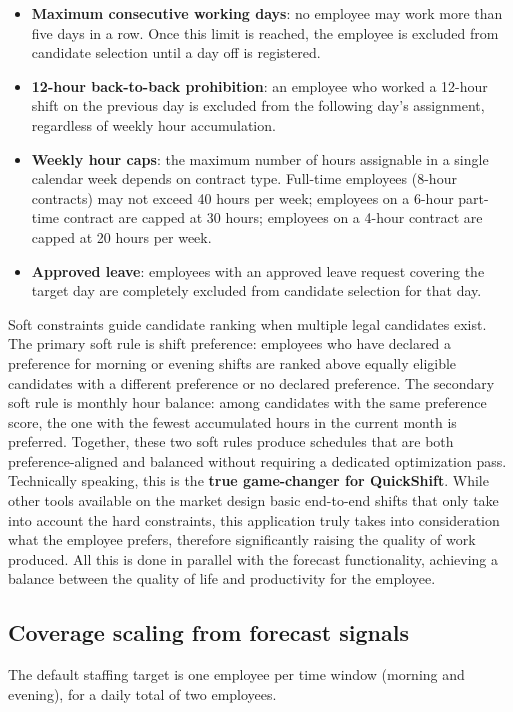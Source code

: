 \begin{itemize}
    \item \textbf{Maximum consecutive working days}: no employee may work more than five days in a row. Once this limit is reached, the employee is excluded from candidate selection until a day off is registered.
    \item \textbf{12-hour back-to-back prohibition}: an employee who worked a 12-hour shift on the previous day is excluded from the following day's assignment, regardless of weekly hour accumulation.
    \item \textbf{Weekly hour caps}: the maximum number of hours assignable in a single calendar week depends on contract type. Full-time employees (8-hour contracts) may not exceed 40 hours per week; employees on a 6-hour part-time contract are capped at 30 hours; employees on a 4-hour contract are capped at 20 hours per week.
    \item \textbf{Approved leave}: employees with an approved leave request covering the target day are completely excluded from candidate selection for that day.
\end{itemize}

\par Soft constraints guide candidate ranking when multiple legal candidates exist. The primary soft rule is shift preference: employees who have declared a preference for morning or evening shifts are ranked above equally eligible candidates with a different preference or no declared preference. The secondary soft rule is monthly hour balance: among candidates with the same preference score, the one with the fewest accumulated hours in the current month is preferred. Together, these two soft rules produce schedules that are both preference-aligned and balanced without requiring a dedicated optimization pass. Technically speaking, this is the \textbf{true game-changer for QuickShift}. While other tools available on the market design basic end-to-end shifts that only take into account the hard constraints, this application truly takes into consideration what the employee prefers, therefore significantly raising the quality of work produced. All this is done in parallel with the forecast functionality, achieving a balance between the quality of life and productivity for the employee.

\subsection{Coverage scaling from forecast signals}
\par The default staffing target is one employee per time window (morning and evening), for a daily total of two employees.

